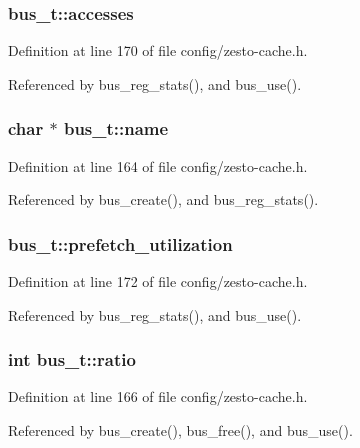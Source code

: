 \subsubsection[{accesses}]{ {\bf bus\_\-t::accesses}}\label{structbus__t_1ef0565ef0e338666abb099cd5feba1e}




Definition at line 170 of file config/zesto-cache.h.

Referenced by bus\_\-reg\_\-stats(), and bus\_\-use().
\subsubsection[{name}]{\setlength{\rightskip}{0pt plus 5cm}char $\ast$ {\bf bus\_\-t::name}}\label{structbus__t_f839aa9900904e02f3afc86774ac3e7e}




Definition at line 164 of file config/zesto-cache.h.

Referenced by bus\_\-create(), and bus\_\-reg\_\-stats().
\subsubsection[{prefetch\_\-utilization}]{ {\bf bus\_\-t::prefetch\_\-utilization}}\label{structbus__t_d82a9ea7590746caa577e6e423fb639b}




Definition at line 172 of file config/zesto-cache.h.

Referenced by bus\_\-reg\_\-stats(), and bus\_\-use().
\subsubsection[{ratio}]{\setlength{\rightskip}{0pt plus 5cm}int {\bf bus\_\-t::ratio}}\label{structbus__t_2c69caeb95f51685fa5029ec566074d7}




Definition at line 166 of file config/zesto-cache.h.

Referenced by bus\_\-create(), bus\_\-free(), and bus\_\-use().
